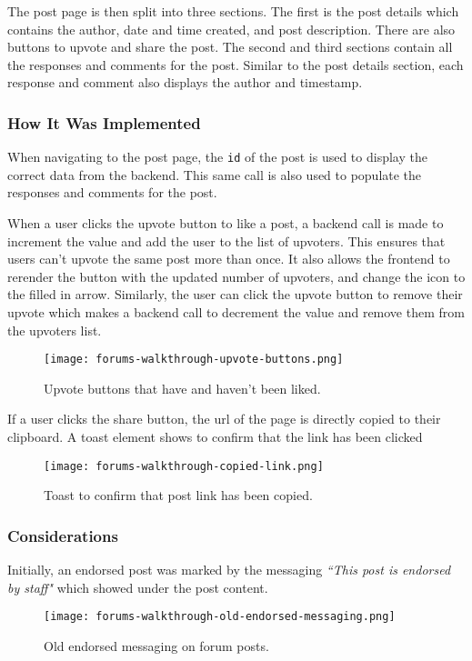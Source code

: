 The post page is then split into three sections.
The first is the post details which contains the author, date and time created, and post description.
There are also buttons to upvote and share the post.
The second and third sections contain all the responses and comments for the post.
Similar to the post details section, each response and comment also displays the author and timestamp.

\subsubsection{How It Was Implemented}
When navigating to the post page, the \texttt{id} of the post is used to display the correct data from the backend.
This same call is also used to populate the responses and comments for the post.

When a user clicks the upvote button to like a post, a backend call is made to increment the value and add the user to the list of upvoters.
This ensures that users can't upvote the same post more than once.
It also allows the frontend to rerender the button with the updated number of upvoters, and change the icon to the filled in arrow.
Similarly, the user can click the upvote button to remove their upvote which makes a backend call to decrement the value and remove them from the upvoters list.

\begin{figure}[h!]
    \texttt{[image: forums-walkthrough-upvote-buttons.png]}
    \centering
    \caption{Upvote buttons that have and haven't been liked.}
\end{figure}

If a user clicks the share button, the url of the page is directly copied to their clipboard.
A toast element shows to confirm that the link has been clicked

\begin{figure}[h!]
    \texttt{[image: forums-walkthrough-copied-link.png]}
    \centering
    \caption{Toast to confirm that post link has been copied.}
\end{figure}

\subsubsection{Considerations}
Initially, an endorsed post was marked by the messaging \textit{``This post is endorsed by staff"} which showed under the post content.

\begin{figure}[h!]
    \texttt{[image: forums-walkthrough-old-endorsed-messaging.png]}
    \centering
    \caption{Old endorsed messaging on forum posts.}
\end{figure}

